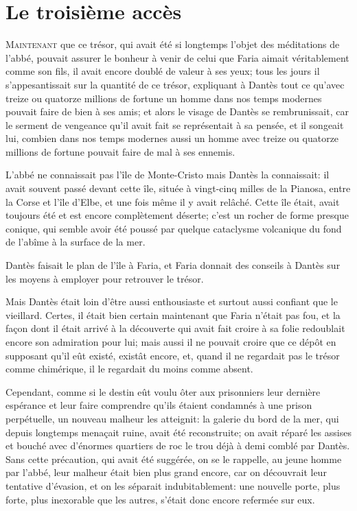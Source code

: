 \chapter{Le troisième accès}

\lettrine{M}{aintenant} que ce trésor, qui avait été si longtemps l'objet des méditations de l'abbé, pouvait assurer le bonheur à venir de celui que Faria aimait véritablement comme son fils, il avait encore doublé de valeur à ses yeux; tous les jours il s'appesantissait sur la quantité de ce trésor, expliquant à Dantès tout ce qu'avec treize ou quatorze millions de fortune un homme dans nos temps modernes pouvait faire de bien à ses amis; et alors le visage de Dantès se rembrunissait, car le serment de vengeance qu'il avait fait se représentait à sa pensée, et il songeait lui, combien dans nos temps modernes aussi un homme avec treize ou quatorze millions de fortune pouvait faire de mal à ses ennemis.

L'abbé ne connaissait pas l'île de Monte-Cristo mais Dantès la connaissait: il avait souvent passé devant cette île, située à vingt-cinq milles de la Pianosa, entre la Corse et l'île d'Elbe, et une fois même il y avait relâché. Cette île était, avait toujours été et est encore complètement déserte; c'est un rocher de forme presque conique, qui semble avoir été poussé par quelque cataclysme volcanique du fond de l'abîme à la surface de la mer.

Dantès faisait le plan de l'île à Faria, et Faria donnait des conseils à Dantès sur les moyens à employer pour retrouver le trésor.

Mais Dantès était loin d'être aussi enthousiaste et surtout aussi confiant que le vieillard. Certes, il était bien certain maintenant que Faria n'était pas fou, et la façon dont il était arrivé à la découverte qui avait fait croire à sa folie redoublait encore son admiration pour lui; mais aussi il ne pouvait croire que ce dépôt en supposant qu'il eût existé, existât encore, et, quand il ne regardait pas le trésor comme chimérique, il le regardait du moins comme absent.

Cependant, comme si le destin eût voulu ôter aux prisonniers leur dernière espérance et leur faire comprendre qu'ils étaient condamnés à une prison perpétuelle, un nouveau malheur les atteignit: la galerie du bord de la mer, qui depuis longtemps menaçait ruine, avait été reconstruite; on avait réparé les assises et bouché avec d'énormes quartiers de roc le trou déjà à demi comblé par Dantès. Sans cette précaution, qui avait été suggérée, on se le rappelle, au jeune homme par l'abbé, leur malheur était bien plus grand encore, car on découvrait leur tentative d'évasion, et on les séparait indubitablement: une nouvelle porte, plus forte, plus inexorable que les autres, s'était donc encore refermée sur eux.

